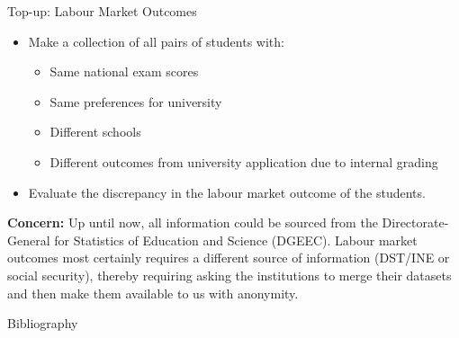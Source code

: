 \documentclass{beamer}
\begin{document}
\begin{frame}{Top-up: Labour Market Outcomes}

\begin{itemize}
    \item Make a collection of all pairs of students with:
    \begin{itemize}
        \item Same national exam scores
        \item Same preferences for university
        \item Different schools
        \item Different outcomes from university application due to internal grading
    \end{itemize}
    \item Evaluate the discrepancy in the labour market outcome of the students.    
\end{itemize}

\textbf{Concern:} Up until now, all information could be sourced from the  Directorate-General for Statistics of Education and Science (DGEEC). Labour market outcomes most certainly requires a different source of information (DST/INE or social security), thereby requiring asking the institutions to merge their datasets and then make them available to us with anonymity.
   
\end{frame}

\begin{frame}{Bibliography}

    
\end{frame}

\end{document}
